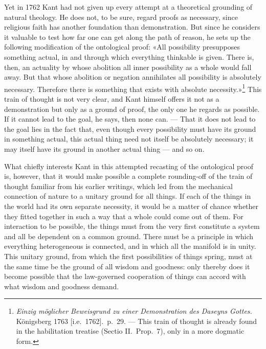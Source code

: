 \documentclass[12pt,a4paper]{article}
\newcommand{\opage}[1]{\marginnote{\footnotesize\textit{[#1]}}}
\begin{document}
Yet in 1762 Kant had not given up every attempt at a theoretical grounding
of natural theology. He does not, to be sure, regard proofs as necessary,
since religious faith has another foundation than demonstration. But since
he considers it valuable to test how far one can get along the path of
reason, he sets up the following modification of the ontological proof:
«All possibility presupposes something actual, in and through which
everything thinkable is given. There is, then, an actuality by whose
abolition all inner possibility as a whole would fall away. But that whose
abolition or negation annihilates all possibility is absolutely necessary.
Therefore there is something that exists with absolute
necessity.»\footnote{\textit{Einzig möglicher Beweisgrund zu einer
Demonstration des Daseyns Gottes.} Königsberg 1763 [i.e.\ 1762].\ p.\ 29.
--- This train of thought is already found in the habilitation treatise
(Sectio II.\ Prop.\ 7), only in a more dogmatic form.} This train of
thought is not very clear, and Kant himself offers it not as a
demonstration but only as a ground of proof, the only one he regards as
possible. If it cannot lead to the goal, he says, then none can. --- That
it does not lead to the goal lies in the fact that, even though every
possibility must have its ground in something actual, this actual thing
need not itself be absolutely necessary; it may itself have its ground in
another actual thing --- and so on.

What chiefly interests Kant in this attempted recasting of the ontological
proof is, however, that it would make possible a complete rounding-off of
the train of thought familiar from his earlier writings, which led from
the mechanical connection of nature to a unitary ground for all things.
If each of the things in the world had its own separate necessity, it
would be a matter of chance whether they fitted together in such a way
that a whole could come out of them. For interaction to be possible, the
things must from the very first \opage{13}constitute a system and all be dependent
on a common ground. There must be a principle in which everything
heterogeneous is connected, and in which all the manifold is in unity.
This unitary ground, from which the first possibilities of things spring,
must at the same time be the ground of all wisdom and goodness: only
thereby does it become possible that the law-governed cooperation of
things can accord with what wisdom and goodness demand.
\end{document}
